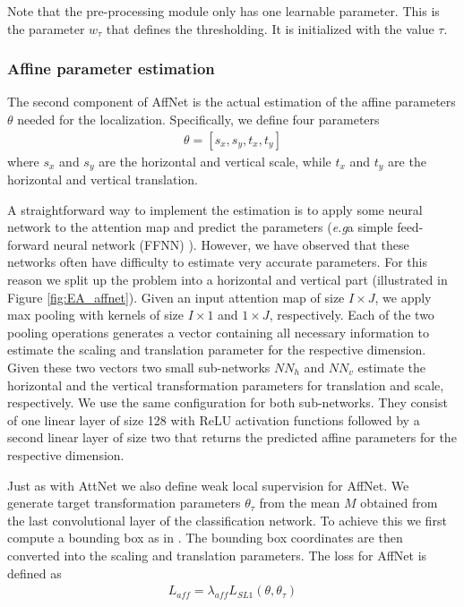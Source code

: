 \documentclass{bmvc2k}
\def\eg{\emph{e.g}\bmvaOneDot}
\begin{document}
Note that the pre-processing module only has one learnable parameter. This is the parameter $w_{\tau}$ that defines the thresholding. It is initialized with the value $\tau$. 

\subsubsection{Affine parameter estimation}
The second component of AffNet is the actual estimation of the affine parameters $\theta$ needed for the localization. Specifically, we define four parameters 
\begin{align}
  \label{formula:theta}
  \theta = [s_x,s_y,t_x,t_y]
\end{align}
where $s_x$ and $s_y$ are the horizontal and vertical scale, while $t_x$ and $t_y$ are the horizontal and vertical translation.

A straightforward way to implement the estimation is to apply some neural network to the attention map and predict the parameters (\eg a simple feed-forward neural network (FFNN) \cite{fu2017look}). However, we have observed that these networks often have difficulty to estimate very accurate parameters. For this reason we split up the problem into a horizontal and vertical part (illustrated in Figure \ref{fig:EA_affnet}). Given an input attention map of size $I \times J$, we apply max pooling with kernels of size $I \times 1$ and $1 \times J$, respectively. Each of the two pooling operations generates a vector containing all necessary information to estimate the scaling and translation parameter for the respective dimension. Given these two vectors two small sub-networks $NN_h$ and $NN_v$ estimate the horizontal and the vertical transformation parameters for translation and scale, respectively. We use the same configuration for both sub-networks. They consist of one linear layer of size 128 with ReLU activation functions followed by a second linear layer of size two that returns the predicted affine parameters for the respective dimension.

Just as with AttNet we also define weak local supervision for AffNet. We generate target transformation parameters $\theta_{\tau}$ from the mean $M$ obtained from the last convolutional layer of the classification network. To achieve this we first compute a bounding box as in \cite{Hanselmann_2020_WACV}. The bounding box coordinates are then converted into the scaling and translation parameters. The loss for AffNet is defined as
\begin{align}
  \label{formula:E2E_LAff}
  L_{aff} =  \lambda_{aff} L_{SL1}(\theta,\theta_{\tau})
\end{align}
\end{document}
